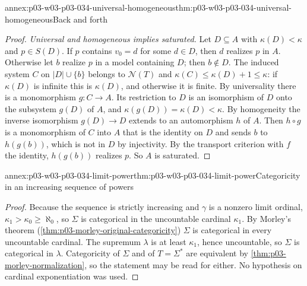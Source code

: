 \begin{annexitem}{annex:p03-w03-p03-034-universal-homogeneous}{thm:p03-w03-p03-034-universal-homogeneous}{Back and forth}
\begin{proof}
\emph{Universal and homogeneous implies saturated.} Let \(D\subseteq A\)
with \(\kappa(D)<\kappa\) and \(p\in S(D)\). If \(p\) contains
\(v_0=d\) for some \(d\in D\), then \(d\) realizes \(p\) in \(A\).
Otherwise let \(b\) realize \(p\) in a model containing \(D\); then
\(b\notin D\). The induced system \(C\) on \(|D|\cup\{b\}\) belongs to
\(\mathcal N(T)\) and \(\kappa(C)\leq\kappa(D)+1\leq\kappa\): if
\(\kappa(D)\) is infinite this is \(\kappa(D)\), and otherwise it is
finite. By universality there is a monomorphism \(g:C\to A\). Its
restriction to \(D\) is an isomorphism of \(D\) onto the subsystem
\(g(D)\) of \(A\), and \(\kappa(g(D))=\kappa(D)<\kappa\). By homogeneity
the inverse isomorphism \(g(D)\to D\) extends to an automorphism \(h\) of
\(A\). Then \(h\circ g\) is a monomorphism of \(C\) into \(A\) that is the
identity on \(D\) and sends \(b\) to \(h(g(b))\), which is not in \(D\) by
injectivity. By the transport
criterion with \(f\) the identity, \(h(g(b))\) realizes \(p\). So \(A\) is
saturated.
\end{proof}
\end{annexitem}

\begin{annexitem}{annex:p03-w03-p03-034-limit-power}{thm:p03-w03-p03-034-limit-power}{Categoricity in an increasing sequence of powers}
\begin{proof}
Because the sequence is strictly increasing and \(\gamma\) is a nonzero limit
ordinal, \(\kappa_1>\kappa_0\geq\aleph_0\), so \(\Sigma\) is categorical
in the uncountable cardinal \(\kappa_1\). By Morley's theorem
(\cref{thm:p03-morley-original-categoricity}) \(\Sigma\) is categorical in
every uncountable cardinal. The supremum \(\lambda\) is at least
\(\kappa_1\), hence uncountable, so \(\Sigma\) is categorical in
\(\lambda\). Categoricity of \(\Sigma\) and of \(T=\Sigma^*\) are
equivalent by \cref{thm:p03-morley-normalization}, so the statement may be
read for either. No hypothesis on cardinal exponentiation was used.
\end{proof}
\end{annexitem}

